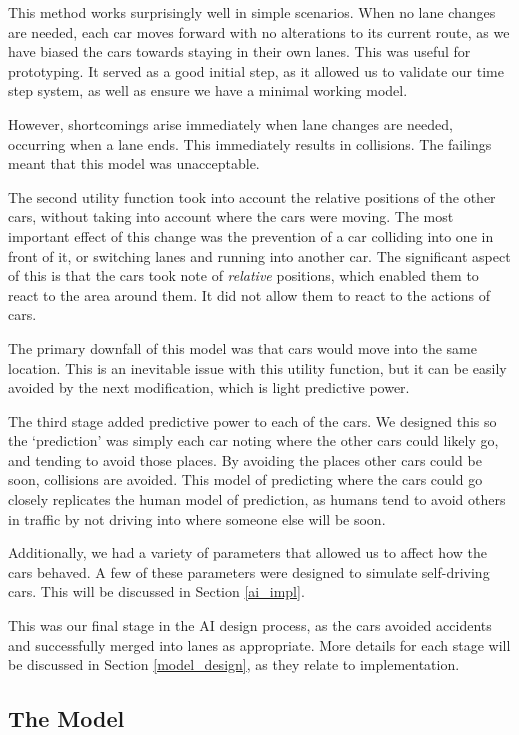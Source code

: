 \documentclass[a4paper, 11pt]{article}
\begin{document}
This method works surprisingly well in simple scenarios. When no lane changes are needed, each car moves forward with no alterations to its current route, 
as we have biased the cars towards staying in their own lanes. This was useful for prototyping. It served as a good initial step, as it allowed us to validate our time step system, as well as ensure 
we have a minimal working model. 

However, shortcomings arise immediately when lane changes are needed, occurring when a lane ends. This immediately results in collisions. 
The failings meant that this model was unacceptable. 

The second utility function took into account the relative positions of the other cars, without taking into account where the cars were moving. 
The most important effect of this change was the prevention of a car colliding into one in front of it, or switching lanes 
and running into another car. The significant aspect of this is that the cars took note of \textit{relative} positions, which enabled them to react 
to the area around them. It did not allow them to react to the actions of cars. 

The primary downfall of this model was that cars would move into the same location. This is an inevitable issue with this utility function, but it can 
be easily avoided by the next modification, which is light predictive power.

The third stage added predictive power to each of the cars. We designed this so the `prediction' was simply each car noting where the 
other cars could likely go, and tending to avoid those places. By avoiding the places other cars could be soon, collisions are avoided. 
This model of predicting where the cars could go closely replicates the human model of prediction, as humans tend to avoid others in traffic by not driving 
into where someone else will be soon. 

Additionally, we had a variety of parameters that allowed us to affect how the cars behaved. A few of these parameters were 
designed to simulate self-driving cars. This will be discussed in Section \ref{ai_impl}.

This was our final stage in the AI design process, as the cars avoided accidents and successfully merged into lanes as appropriate. More details for 
each stage will be discussed in Section \ref{model_design}, as they relate to implementation. 

\subsection{The Model}
\end{document}
